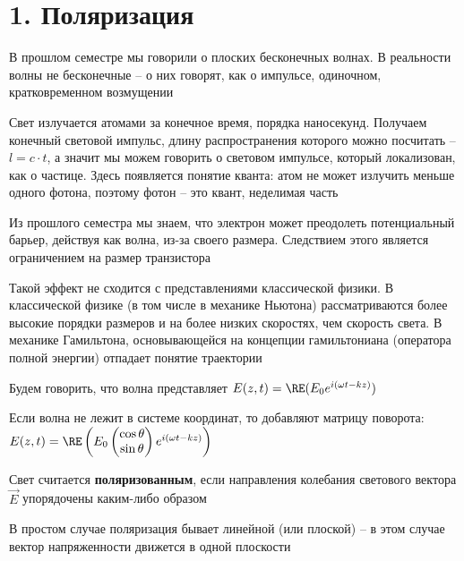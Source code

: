 \documentclass[12pt]{article}
\begin{document}
    \tableofcontents
    \clearpage






\section{1. Поляризация}

В прошлом семестре мы говорили о плоских бесконечных волнах. В реальности волны не бесконечные -- о них говорят, как о импульсе, одиночном, кратковременном возмущении

Свет излучается атомами за конечное время, порядка наносекунд. Получаем конечный световой импульс, длину распространения которого можно посчитать -- $l = c \cdot t$, а значит мы можем говорить о световом импульсе, который локализован, как о частице. Здесь появляется понятие кванта: атом не может излучить меньше одного фотона, поэтому фотон -- это квант, неделимая часть

Из прошлого семестра мы знаем, что электрон может преодолеть потенциальный барьер, действуя как волна, из-за своего размера. Следствием этого является ограничением на размер транзистора

Такой эффект не сходится с представлениями классической физики. В классической физике (в том числе в механике Ньютона) рассматриваются более высокие порядки размеров и на более низких скоростях, чем скорость света.
В механике Гамильтона, основывающейся на концепции гамильтониана (оператора полной энергии) отпадает понятие траектории

\mediumvspace

Будем говорить, что волна представляет $E(z, t) = \RE(E_0 e^{i(\omega t - kz)})$

Если волна не лежит в системе координат, то добавляют матрицу поворота: $E(z, t) = \RE\left(E_0 \begin{pmatrix}\cos \theta \\ \sin \theta \end{pmatrix} e^{i(\omega t - kz)}\right)$

\smallvspace

Свет считается \textbf{поляризованным}, если направления колебания светового вектора $\vec E$ упорядочены каким-либо образом


В простом случае поляризация бывает линейной (или плоской) -- в этом случае вектор напряженности движется в одной плоскости
\end{document}
